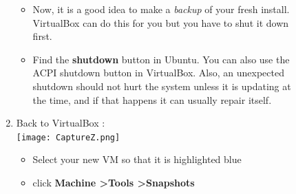 \documentclass[12pt]{article}
\begin{document}
\begin{description}
\begin{description}
\begin{enumerate}[label=\alph*)]
      		 \begin{itemize}
      		\item Now, it is a good idea to make a {\it backup} of your fresh install. VirtualBox can do this for you but you have to shut it down first.  
         
     		\item Find the {\bf shutdown} button in Ubuntu. You can also use the ACPI shutdown button in VirtualBox. Also, an unexpected shutdown should not hurt the system unless it is updating at the time, and if that happens it can usually repair itself. 
    		\end{itemize}
    		
%         
    		
    		\newpage
    		\item Back to VirtualBox : \vspace{5mm} \\
      		\texttt{[image: CaptureZ.png]}
      		 \begin{itemize}
        	\item Select your new VM so that it is highlighted blue
        	\item click {\bf Machine \textgreater Tools \textgreater Snapshots} 
    		\end{itemize} 
    		 \vspace{5mm} 
    		 

\end{enumerate}
\end{description}
\end{description}
\end{document}
